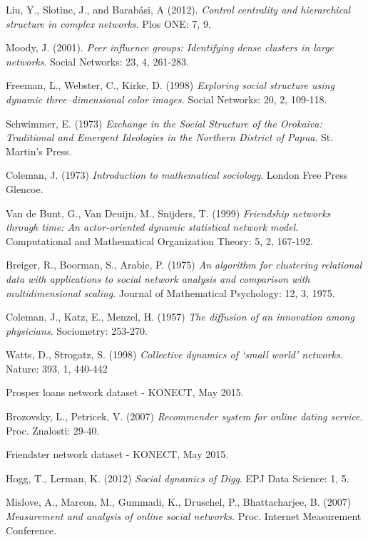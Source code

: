 \documentclass[3p,times]{elsarticle}
\begin{document}
\begin{enumerate}
\begin{thebibliography}{9}
	Liu, Y., Slotine, J., and Barab{\'a}si, A (2012).
	\textit{Control centrality and hierarchical structure in complex networks}.
	Plos ONE: 7, 9.
	
	Moody, J. (2001).
	\textit{Peer influence groups: Identifying dense clusters in large networks}.
	Social Networks: 23, 4, 261-283.
	
	Freeman, L., Webster, C., Kirke, D. (1998)
	\textit{Exploring social structure using dynamic three--dimensional color images.}
	Social Networks: 20, 2, 109-118.
	
	Schwimmer, E. (1973)
	\textit{Exchange in the Social Structure of the Orokaiva: Traditional and Emergent Ideologies in the Northern District of Papua}.
	St. Martin's Press.
	
	Coleman, J. (1973)
	\textit{Introduction to mathematical sociology}.
	London Free Press Glencoe.
	
	Van de Bunt, G., Van Deuijn, M., Snijders, T. (1999)
	\textit{Friendship networks through time: An actor-oriented dynamic statistical network model}.
	Computational and Mathematical Organization Theory: 5, 2, 167-192.
	
	Breiger, R., Boorman, S., Arabie, P. (1975)
	\textit{An algorithm for clustering relational data with applications to social network analysis and comparison with multidimensional scaling}.
	Journal of Mathematical Psychology: 12, 3, 1975.
	
	Coleman, J., Katz, E., Menzel, H. (1957)
	\textit{The diffusion of an innovation among physicians}.
	Sociometry: 253-270.
	
	Watts, D., Strogatz, S. (1998)
	\textit{Collective dynamics of `small world' networks}.
	Nature: 393, 1, 440-442
	
	Prosper loans network dataset - KONECT, May 2015.
	
	Brozovsky, L., Petricek, V. (2007)
	\textit{Recommender system for online dating service}.
	Proc. Znalosti: 29-40.
	
	Friendster network dataset - KONECT, May 2015.
	
	Hogg, T., Lerman, K. (2012)
	\textit{Social dynamics of Digg}.
	EPJ Data Science: 1, 5.
	
	Mislove, A., Marcon, M., Gummadi, K., Druschel, P., Bhattacharjee, B. (2007)
	\textit{Measurement and analysis of online social networks}.
	Proc. Internet Measurement Conference.
	

\end{thebibliography}
\end{enumerate}
\end{document}
